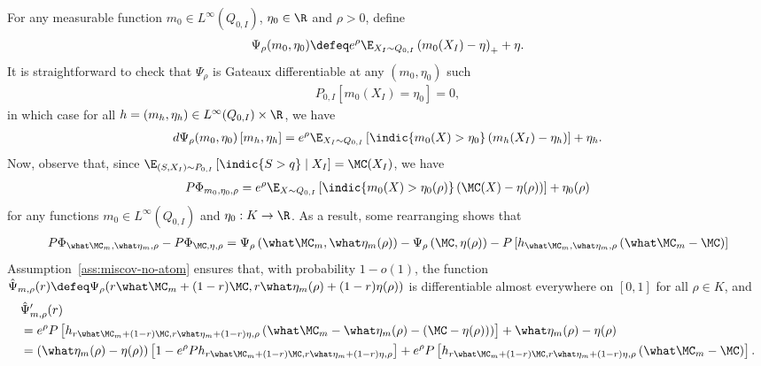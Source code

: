 For any measurable function $m_0 \in L^\infty(Q_{0,I})$,  $\eta_0 \in \R$ and $\rho > 0$, define
\begin{align*}
\Psi_\rho(m_0, \eta_0) \defeq e^\rho \E_{X_I \sim Q_{0,I}} \left( m_0(X_I) - \eta\right)_+ + \eta.
\end{align*}
It is straightforward to check that $\Psi_\rho$ is Gateaux differentiable at any $(m_0, \eta_0)$ such 
\begin{align*}
P_{0,I}\left[ m_0(X_I) = \eta_0 \right] =0,
\end{align*}
in which case for all $h=(m_h, \eta_h) \in  L^\infty(Q_{0,I}) \times \R$, we have
\begin{align*}
d\Psi_\rho(m_0,\eta_0)\left[m_h, \eta_h \right] = e^\rho \E_{X_I \sim Q_{0,I}} \left[ \indic{ m_0(X) > \eta_0 } \left( m_h(X_I) - \eta_h \right) \right] + \eta_h.
\end{align*}
Now, observe that, since $\E_{(S,X_I) \sim P_{0,I}} \left[ \indic{S > q} \mid X_I \right] = \MC(X_I)$, we have 
\begin{align*}
P \Phi_{m_0,  \eta_0, \rho} = e^\rho \E_{X \sim Q_{0,I}} \left[ \indic{m_0(X) > \eta_0(\rho)} \left( \MC(X) - \eta(\rho)\right) \right] + \eta_0(\rho)
\end{align*}
for any functions $m_0 \in L^\infty(Q_{0,I})$ and $\eta_0: K \to \R$.
As a result, some rearranging shows that
\begin{align*}
P \Phi_{\what \MC_m, \what \eta_m, \rho} - P\Phi_{\MC,  \eta, \rho} = \Psi_\rho \left( \what \MC_m, \what \eta_m(\rho) \right) - \Psi_\rho \left( \MC,  \eta(\rho) \right) - P \left[ h_{\what \MC_m,  \what \eta_m, \rho}\left( \what \MC_m - \MC \right) \right]
\end{align*}
Assumption~\ref{ass:miscov-no-atom} ensures that, with probability $1-o(1)$, the function $\hat \Psi_{m,\rho}(r)  \defeq  \Psi_\rho( r \what \MC_m + (1-r) \MC,  r \what \eta_m(\rho) + (1-r) \eta(\rho))$ is differentiable almost everywhere on $[0,1]$ for all $\rho \in K$, and
\begin{align*}
&\hat \Psi_{m,\rho}'(r) \\
&= e^\rho P\left[ h_{r \what \MC_m + (1-r) \MC,  r \what \eta_m + (1-r) \eta, \rho} \left(\what \MC_m - \what \eta_m(\rho) - (\MC - \eta(\rho)) \right) \right] + \what \eta_m(\rho) - \eta(\rho) \\
&= \left(\what \eta_m(\rho) - \eta(\rho) \right) \left[1 - e^\rho P h_{r \what \MC_m + (1-r) \MC,  r \what \eta_m + (1-r) \eta, \rho}\right] + e^\rho P\left[ h_{r \what \MC_m + (1-r) \MC,  r \what \eta_m + (1-r) \eta, \rho} \left(\what \MC_m - \MC \right) \right].
\end{align*}
